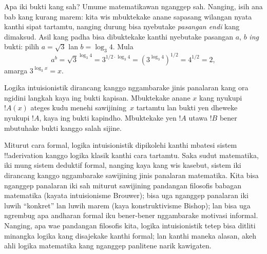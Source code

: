 \documentclass[../../../include/open-logic-chapter]{subfiles}
\begin{document}
Apa iki bukti kang sah? Umume matematikawan nganggep sah. Nanging,
isih ana bab kang kurang marem: kita wis mbuktekake anane sapasang
wilangan nyata kanthi sipat tartamtu, nanging durung bisa nyebutake
\emph{pasangan endi} kang dimaksud. Asil kang padha bisa dibuktekake
kanthi nyebutake pasangan $a$, $b$ \emph{ing} bukti: pilih
$a = \sqrt{3}$ lan $b = \log_3 4$. Mula
\[
a^b = \sqrt{3}^{\log_3 4} = 3^{1/2 \cdot \log_3 4} = (3^{\log_3
  4})^{1/2} = 4^{1/2}= 2,
\]
amarga $3^{\log_3 x} = x$.

Logika intuisionistik dirancang kanggo nggambarake jinis panalaran
kang ora ngidini langkah kaya ing bukti kapisan. Mbuktekake anane
$x$ kang nyukupi~$!A(x)$ ateges kudu menehi sawijining~$x$ tartamtu
lan bukti yen dheweke nyukupi $!A$, kaya ing bukti kapindho.
Mbuktekake yen $!A$ utawa $!B$ bener mbutuhake bukti kanggo salah
sijine.

Miturut cara formal, logika intuisionistik dipikolehi kanthi mbatesi
sistem !!a{derivation} kanggo logika klasik kanthi cara tartamtu.
Saka sudut matematika, iki mung sistem deduktif formal, nanging kaya
kang wis kasebut, sistem iki dirancang kanggo nggambarake sawijining
jinis panalaran matematika. Kita bisa nganggep panalaran iki sah
miturut sawijining pandangan filosofis babagan matematika (kayata
intuisionisme Brouwer); bisa uga nganggep panalaran iki luwih
``konkret'' lan luwih marem (kaya konstruktivisme Bishop); lan bisa
uga ngrembug apa andharan formal iku bener-bener nggambarake
motivasi informal. Nanging, apa wae pandangan filosofis kita,
logika intuisionistik tetep bisa ditliti minangka logika kang
disajekake kanthi formal; lan kanthi maneka alasan, akeh ahli
logika matematika kang nganggep panlitene narik kawigaten.
\end{document}
